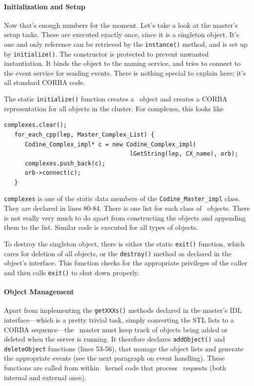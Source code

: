 \paragraph{Initialization and Setup}
Now that's enough numbers for the moment. Let's take a look at the master's
setup tasks. These are executed exactly once, since it is a singleton object.
It's one and only reference can be retrieved by the \texttt{instance()} method,
and is set up by \texttt{initialize()}. The constructor is protected to prevent
unwanted instantiation. It binds the object to the naming service, and tries
to connect to the event service for sending events. There is nothing special
to explain here; it's all standard CORBA code.

The static \texttt{initialize()} function creates a \master\ object and
creates a CORBA representation for all objects in the cluster. For complexes,
this looks like

\begin{Verbatim}[fontsize=\small, frame=single]
   complexes.clear();
   for_each_cpp(lep, Master_Complex_List) {
      Codine_Complex_impl* c = new Codine_Complex_impl(
                                    lGetString(lep, CX_name), orb);
      complexes.push_back(c);
      orb->connect(c);
   }
 \end{Verbatim}

\texttt{complexes} is one of the static data members of the
\texttt{Codine\_Master\_impl} class. They are declared in lines 80-84. There
is one list for each class of \codine\ objects. There is not really very much
to do apart from constructing the objects and appending them to the list.
Similar code is executed for all types of objects.

To destroy the singleton object, there is either the static \texttt{exit()}
function, which cares for deletion of all objects, or the \texttt{destroy()}
method as declared in the object's interface. This function checks for the
appropriate privileges of the caller and then calls \texttt{exit()} to shut
down properly.

\paragraph{Object Management}
Apart from implementing the \texttt{getXXXs()} methods declared in the
master's IDL interface---which is a pretty trivial task, simply converting
the STL lists to a CORBA sequence---the \qidl\ master must keep track of
objects being added or deleted when the server is running. It therefore
declares \texttt{addObject()} and \texttt{deleteObject} functions (lines
53-56), that manage the object lists and generate the appropriate events (see
the next paragraph on event handling). These functions are called from within
\codine\ kernel code that process \codapi\ requests (both internal and
external ones). 

